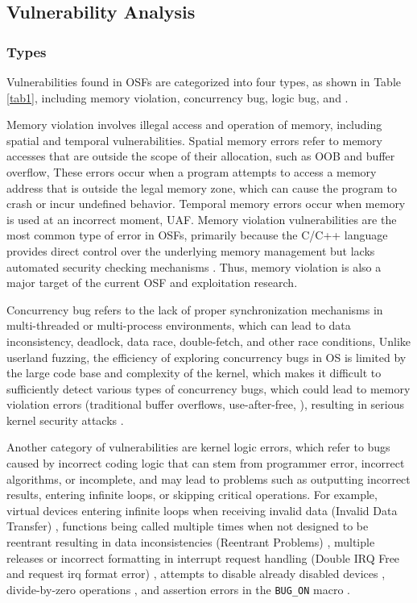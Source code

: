 \subsection{Vulnerability Analysis}
\label{Vulnerability}

\subsubsection{Types}

Vulnerabilities found in OSFs are categorized into four types, as shown in Table \ref{tab1}, including memory violation, concurrency bug, logic bug, and .

Memory violation involves illegal access and operation of memory, including spatial and temporal vulnerabilities. Spatial memory errors refer to memory accesses that are outside the scope of their allocation, such as OOB and buffer overflow, \etc These errors occur when a program attempts to access a memory address that is outside the legal memory zone, which can cause the program to crash or incur undefined behavior. Temporal memory errors occur when memory is used at an incorrect moment, \eg UAF. Memory violation vulnerabilities are the most common type of error in OSFs, primarily because the C/C++ language provides direct control over the underlying memory management but lacks automated security checking mechanisms \cite{Unicorefuzz2019,chen2020koobe}. Thus, memory violation is also a major target of the current OSF and exploitation research.

Concurrency bug refers to the lack of proper synchronization mechanisms in multi-threaded or multi-process environments, which can lead to data inconsistency, deadlock, data race, double-fetch, and other race conditions, \etc Unlike userland fuzzing, the efficiency of exploring concurrency bugs in OS is limited by the large code base and complexity of the kernel, which makes it difficult to sufficiently detect various types of concurrency bugs, which could lead to memory violation errors (\eg traditional buffer overflows, use-after-free, \etc), resulting in serious kernel security attacks \cite{jeong2019razzer}.

Another category of vulnerabilities are kernel logic errors, which refer to bugs caused by incorrect coding logic that can stem from programmer error, incorrect algorithms, or incomplete, and may lead to problems such as outputting incorrect results, entering infinite loops, or skipping critical operations. For example, virtual devices entering infinite loops when receiving invalid data (Invalid Data Transfer) \cite{henderson2017vdf,pan2021V-shuttle,Liu2023VDGuard}, functions being called multiple times when not designed to be reentrant resulting in data inconsistencies (Reentrant Problems) \cite{myung2022mundofuzz}, multiple releases or incorrect formatting in interrupt request handling (Double IRQ Free and request irq format error) \cite{wu2023devfuzz}, attempts to disable already disabled devices \cite{wu2023devfuzz}, divide-by-zero operations \cite{pan2021V-shuttle}, and assertion errors in the \texttt{BUG\_ON} macro \cite{wu2023devfuzz,2017DIFUZE,pailoor2018moonshine,schumilo2020hyper}.

